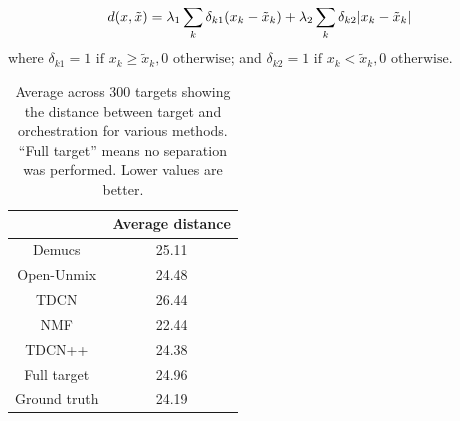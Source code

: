 \documentclass{article}
\begin{document}
		\begin{equation}\label{eqn:distance}
d(x, \tilde{x}) =\lambda_1 \sum_k \delta_{k1}(x_k - \tilde{x}_k) + \lambda_2 \sum_k \delta_{k2}|x_k - \tilde{x	}_k| \\
\end{equation}
where $\delta_{k1} = 1 \text{  if  } x_k \ge \tilde{x}_k, 0 \text{  otherwise}$; and $\delta_{k2} = 1 \text{  if  } x_k < \tilde{x}_k, 0 \text{  otherwise}$.
	
	
	\begin{table}[t]
		\begin{center}
			\begin{tabular}{|c|c|}
				\hline
				& Average distance \\
				\hline
				Demucs & 25.11 \\
				\hline
				Open-Unmix & 24.48\\
				\hline
				TDCN & 26.44\\
				\hline
				NMF & 22.44 \\
				\hline
				TDCN++ & 24.38 \\
				\hline
				Full target & 24.96 \\
				\hline
				Ground truth & 24.19 \\
				\hline
			\end{tabular}
		\end{center}
		\caption{Average across 300 targets showing the distance between target and orchestration for various methods. ``Full target'' means no separation was performed. Lower values are better.}
		\label{tab:distances}
	\end{table}
	
	
\end{document}

